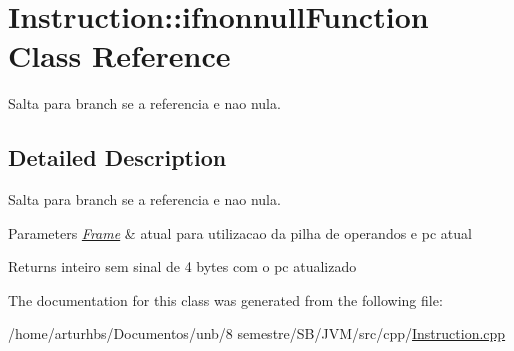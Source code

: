 \hypertarget{classInstruction_1_1ifnonnullFunction}{}\section{Instruction\+:\+:ifnonnull\+Function Class Reference}
\label{classInstruction_1_1ifnonnullFunction}


Salta para branch se a referencia e nao nula.  




\subsection{Detailed Description}
Salta para branch se a referencia e nao nula. 


\begin{DoxyParams}{Parameters}
{\em \hyperlink{classFrame}{Frame}} & atual para utilizacao da pilha de operandos e pc atual \\
\hline
\end{DoxyParams}
\begin{DoxyReturn}{Returns}
inteiro sem sinal de 4 bytes com o pc atualizado 
\end{DoxyReturn}


The documentation for this class was generated from the following file\+:\begin{DoxyCompactItemize}
\item 
/home/arturhbs/\+Documentos/unb/8 semestre/\+S\+B/\+J\+V\+M/src/cpp/\hyperlink{Instruction_8cpp}{Instruction.\+cpp}\end{DoxyCompactItemize}
